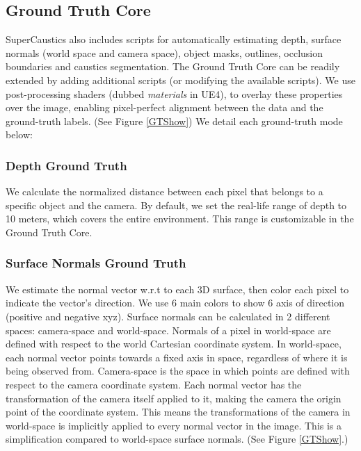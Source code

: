 \documentclass[conference]{IEEEtran}
\begin{document}
\subsection{Ground Truth Core}\label{GT}


SuperCaustics also includes scripts for automatically estimating depth, surface normals (world space and camera space), object masks, outlines, occlusion boundaries and caustics segmentation. The Ground Truth Core can be readily extended by adding additional scripts (or modifying the available scripts). We use post-processing shaders (dubbed \textit{materials} in UE4), to overlay these properties over the image, enabling pixel-perfect alignment between the data and the ground-truth labels. (See Figure \ref{GTShow}) We detail each ground-truth mode below:

\subsubsection{\textbf{Depth Ground Truth}} We calculate the normalized distance between each pixel that belongs to a specific object and the camera. By default, we set the real-life range of depth to 10 meters, which covers the entire environment. This range is customizable in the Ground Truth Core.

\subsubsection{\textbf{Surface Normals Ground Truth}} We estimate the normal vector w.r.t to each 3D surface, then color each pixel to indicate the vector's direction. We use 6 main colors to show 6 axis of direction (positive and negative xyz). Surface normals can be calculated in 2 different spaces: camera-space and world-space. Normals of a pixel in world-space are defined with respect to the world Cartesian coordinate system. In world-space, each normal vector points towards a fixed axis in space, regardless of where it is being observed from. Camera-space is the space in which points are defined with respect to the camera coordinate system. Each normal vector has the transformation of the camera itself applied to it, making the camera the origin point of the coordinate system. This means the transformations of the camera in world-space is implicitly applied to every normal vector in the image. This is a simplification compared to world-space surface normals. (See Figure \ref{GTShow}.)
\end{document}
